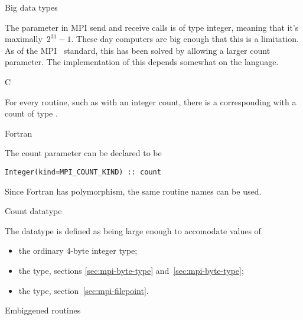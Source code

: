  {Big data types}
\label{sec:mpi-bigdata}

The  parameter in MPI send and receive calls is of type integer,
meaning that it's maximally~$2^{31}-1$. These day computers are big enough
that this is a limitation.
As of the MPI~ standard, this has been solved by allowing a
larger count parameter.
The implementation of this depends somewhat on the language.

 {C}

For every routine, such as  with an integer count,
there is a corresponding  with a count
of type .

 {Fortran}

The count parameter can be declared  to be
\begin{lstlisting}
Integer(kind=MPI_COUNT_KIND) :: count
\end{lstlisting}
Since Fortran has polymorphism, the same routine names can be used.

 {Count datatype}

The  datatype is defined as being large enough
to accomodate values of
\begin{itemize}
\item the ordinary 4-byte integer type;
\item the  type, sections
  \ref{sec:mpi-byte-type} and~\ref{sec:mpi-byte-type};
\item the  type, section~\ref{sec:mpi-filepoint}.
\end{itemize}

 {Embiggened routines}

